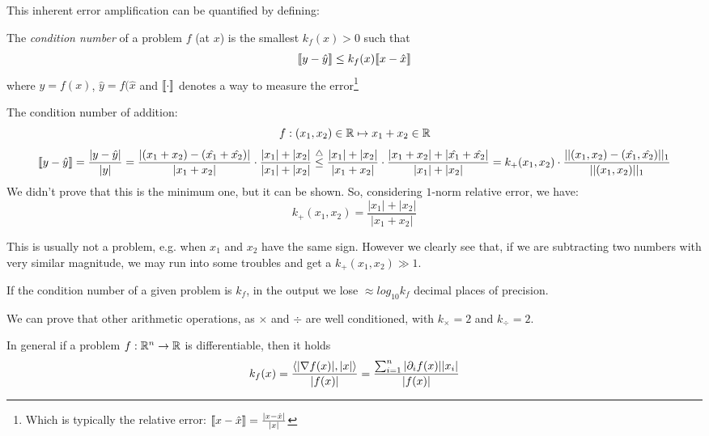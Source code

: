 This inherent error amplification can be quantified by defining:
\begin{Def}
	The \emph{condition number} of a problem $f$ (at $x$) is the smallest $k_f(x) > 0$ such that
	\begin{equation*}
		\llbracket y - \hat{y} \rrbracket \leq k_f(x) \llbracket x - \hat{x} \rrbracket
	\end{equation*}
	where $y = f(x)$, $\hat{y} = f(\hat{x}$ and $\llbracket \cdot \rrbracket$ denotes a way to measure the error\footnote{Which is typically the relative error: $\llbracket x - \hat{x} \rrbracket = \frac{|x - \hat{x}|}{|x|}$}
\end{Def}
\begin{Ex}[$k_+$]
	The condition number of addition:
	\begin{equation*}
		{f : (x_1, x_2) \in \RR \mapsto x_1 + x_2 \in \RR}
	\end{equation*}
	\begin{dmath*}
		\llb y - \hat{y} \rrb = \frac{|y - \hat{y}|}{|y|}
		= \frac{|(x_1 + x_2) - (\hat{x_1} + \hat{x_2})|}{|x_1 + x_2|} \cdot \frac{|x_1| + |x_2|}{|x_1| + |x_2|} \\
		\stackrel{\triangle}{\leq} \frac{|x_1| + |x_2|}{|x_1 + x_2|} \cdot \frac{|x_1 + x_2| + |\hat{x_1} + \hat{x_2}|}{|x_1| + |x_2|}
		= k_+(x_1,x_2) \cdot \frac{||(x_1, x_2) - (\hat{x_1}, \hat{x_2})||_1}{||(x_1, x_2)||_1}
	\end{dmath*}
	We didn't prove that this is the minimum one, but it can be shown. So, considering $1$-norm relative error, we have:
	\begin{equation*}
		k_+(x_1,x_2) = \frac{|x_1| + |x_2|}{|x_1 + x_2|}
	\end{equation*}
\end{Ex}
\begin{Rem}
	This is usually not a problem, e.g. when $x_1$ and $x_2$ have the same sign. However we clearly see that, if we are subtracting two numbers with very similar magnitude, we may run into some troubles and get a $k_+(x_1,x_2) \gg 1$.
\end{Rem}
\begin{Rem}
	If the condition number of a given problem is $k_f$, in the output we lose $\approx log_{10}k_f$ decimal places of precision.
\end{Rem}

We can prove that other arithmetic operations, as $\times$ and $\div$ are well conditioned, with $k_\times = 2$ and $k_\div = 2$.

\begin{Lemma}
	In general if a problem $f : \mathbb{R}^n \to \mathbb{R}$ is differentiable, then it holds
	\begin{dmath*}
		k_f(x) = \frac{\scalprod{|\nabla f(x)|}{|x|}}{|f(x)|}
		= \frac{\sum_{i=1}^{n} |\partial_i f(x)||x_i|}{|f(x)|}
	\end{dmath*}
\end{Lemma}

